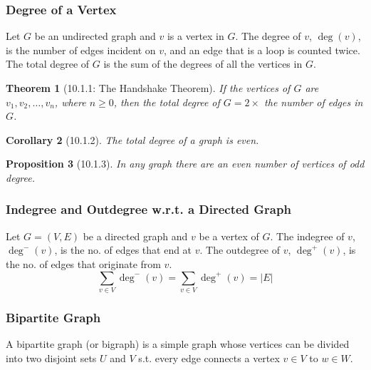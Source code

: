 \documentclass{article}
\theoremstyle{plain}
\newtheorem{theorem}{Theorem}[section]
\newtheorem{corollary}[theorem]{Corollary}
\newtheorem{proposition}[theorem]{Proposition}
\theoremstyle{definition}
\theoremstyle{remark}
\begin{document}
\subsubsection*{Degree of a Vertex}
Let $G$ be an undirected graph and $v$ is a vertex in $G$. The degree of $v$, $\deg(v)$, is the number of edges incident on $v$, and an edge that is a loop is counted twice. The total degree of $G$ is the sum of the degrees of all the vertices in $G$.
 
\begin{theorem}[10.1.1: The Handshake Theorem]
    If the vertices of $G$ are $v_1, v_2, \dots, v_n$, where $n \geq 0$, then the total degree of $G = 2 \times$ the number of edges in $G$.
\end{theorem}
 
\begin{corollary}[10.1.2]
    The total degree of a graph is even.
\end{corollary}
 
\begin{proposition}[10.1.3]
    In any graph there are an even number of vertices of odd degree.
\end{proposition}
 
\subsubsection*{Indegree and Outdegree w.r.t. a Directed Graph}
Let $G = (V,E)$ be a directed graph and $v$ be a vertex of $G$. The indegree of $v$, $\deg^-(v)$, is the no. of edges that end at $v$. The outdegree of $v$, $\deg^+(v)$, is the no. of edges that originate from $v$.
\[ \sum_{v \in V} \deg^-(v) = \sum_{v \in V} \deg^+(v) = |E| \]
 
\subsubsection*{Bipartite Graph}
A bipartite graph (or bigraph) is a simple graph whose vertices can be divided into two disjoint sets $U$ and $V$ s.t. every edge connects a vertex $v \in V$ to $w \in W$.
 
\begin{center}
\end{center}
 
\end{document}
